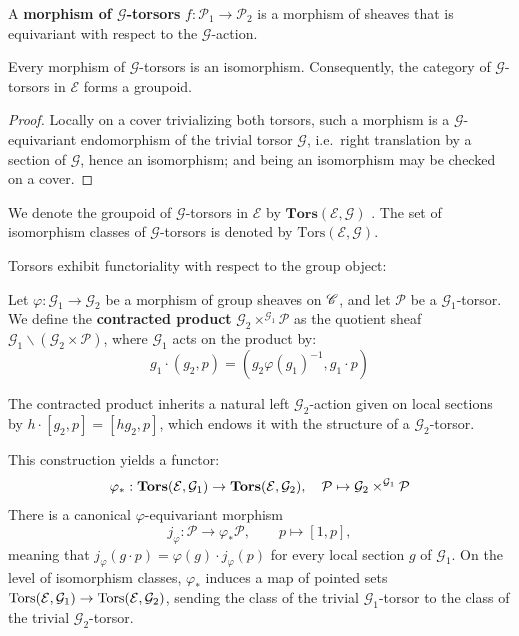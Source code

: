 A \textbf{morphism of $\mathcal{G}$-torsors} $f: \mathcal{P}_1 \to \mathcal{P}_2$ is a morphism of sheaves that is equivariant with respect to the $\mathcal{G}$-action.

\begin{prop}\label{prop:torsor_morphism_iso}
    Every morphism of $\mathcal{G}$-torsors is an isomorphism.
    Consequently, the category of $\mathcal{G}$-torsors in $\mathcal{E}$ forms a groupoid.
\end{prop}
\begin{proof}
    Locally on a cover trivializing both torsors, such a morphism is a $\mathcal{G}$-equivariant endomorphism
    of the trivial torsor $\mathcal{G}$, i.e.\ right translation by a section of $\mathcal{G}$, hence an
    isomorphism; and being an isomorphism may be checked on a cover.
\end{proof}

\begin{definition}
    We denote the groupoid of $\mathcal{G}$-torsors in $\mathcal{E}$ by $\mathbf{Tors}(\mathcal{E}, \mathcal{G})$ .  The set of isomorphism classes of $\mathcal{G}$-torsors is denoted by $\mathrm{Tors}(\mathcal{E}, \mathcal{G})$.
\end{definition}

Torsors exhibit functoriality with respect to the group object:

\begin{definition}
Let $\varphi: \mathcal{G}_1 \to \mathcal{G}_2$ be a morphism of group 
sheaves on $\mathscr{C}$, and let $\mathcal{P}$ be a $\mathcal{G}_1$-torsor. We define the \textbf{contracted product} $\mathcal{G}_2 \times^{\mathcal{G}_1} \mathcal{P}$ as the quotient sheaf $\mathcal{G}_1 \backslash (\mathcal{G}_2 \times \mathcal{P})$, where $\mathcal{G}_1$ acts on the product by:
\[ g_1 \cdot (g_2, p) = (g_2 \varphi(g_1)^{-1}, g_1 \cdot p) \]

The contracted product inherits a natural left $\mathcal{G}_2$-action given on local sections by $h \cdot [g_2, p] = [h g_2, p]$, which endows it with the structure of a $\mathcal{G}_2$-torsor. 
\end{definition}

This construction yields a functor:
\[ \varphi_*: \mathbf{Tors}(\mathcal{E}, \mathcal{G}_1) \to \mathbf{Tors}(\mathcal{E}, \mathcal{G}_2), \quad \mathcal{P} \mapsto \mathcal{G}_2 \times^{\mathcal{G}_1} \mathcal{P} \]
There is a canonical $\varphi$-equivariant morphism
\[
j_\varphi:\mathcal P\longrightarrow\varphi_*\mathcal P,
\qquad p\longmapsto[1,p],
\]
meaning that
$j_\varphi(g\cdot p)=\varphi(g)\cdot j_\varphi(p)$ for every local section
$g$ of $\mathcal G_1$.
On the level of isomorphism classes, $\varphi_*$ induces a map of pointed sets $\mathrm{Tors}(\mathcal{E}, \mathcal{G}_1) \to \mathrm{Tors}(\mathcal{E}, \mathcal{G}_2)$, sending the class of the trivial $\mathcal{G}_1$-torsor to the class of the trivial $\mathcal{G}_2$-torsor.

